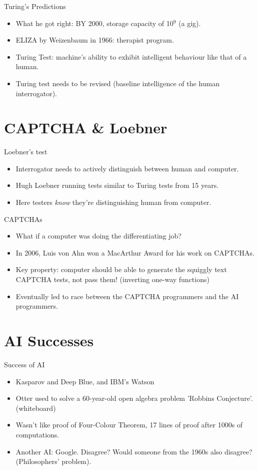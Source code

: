 \documentclass[
    11pt, %
    aspectratio=169, %
]{beamer}
\begin{document}
\begin{frame}{Turing's Predictions}
\begin{itemize}
    \item What he got right: BY 2000, storage capacity of 10$^9$ (a gig).
    \item ELIZA by Weizenbaum in 1966: therapist program.
    \item Turing Test: machine's ability to exhibit intelligent behaviour like that of a human.
    \item Turing test needs to be revised (baseline intelligence of the human interrogator).
\end{itemize}
\end{frame}

\section{CAPTCHA \& Loebner}
\begin{frame}{Loebner's test}
\begin{itemize}
    \item Interrogator needs to actively distinguish between human and computer.
    \item Hugh Loebner running tests similar to Turing tests from 15 years.
    \item Here testers \textit{know} they're distinguishing human from computer.
\end{itemize}
\end{frame}

\begin{frame}{CAPTCHAs}
    \begin{itemize}
        \item What if a computer was doing the differentiating job?
        \item In 2006, Luis von Ahn won a MacArthur Award for his work on CAPTCHAs.
        \item Key property: computer should be able to generate the squiggly text CAPTCHA tests, not pass them! (inverting one-way functions)    
        \item Eventually led to race between the CAPTCHA programmers and the AI programmers.
        \end{itemize}
\end{frame}
\section{AI Successes}
\begin{frame}{Success of AI}
    \begin{itemize}
        \item Kasparov and Deep Blue, and IBM’s Watson
        \item Otter used to solve a 60-year-old open algebra problem 'Robbins Conjecture'. (whiteboard)
        \item Wasn't like proof of Four-Colour Theorem, 17 lines of proof after 1000s of computations.
        \item Another AI: Google. Disagree? Would someone from the 1960s also disagree? (Philosophers' problem).
    \end{itemize}
\end{frame}
\end{document}
